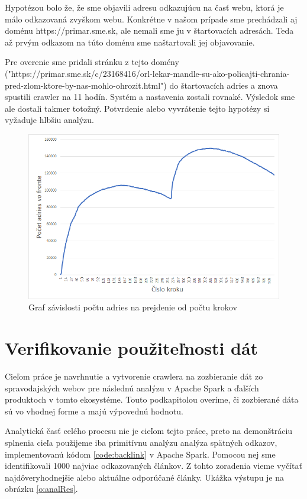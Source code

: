 Hypotézou bolo že, že sme objavili adresu odkazujúcu na časť webu, ktorá je málo odkazovaná zvyškom webu. Konkrétne v našom prípade sme prechádzali aj doménu https://primar.sme.sk, ale nemali sme ju v štartovacích adresách. Teda až prvým odkazom na túto doménu sme naštartovali jej objavovanie. 

Pre overenie sme pridali stránku z tejto domény ("https://primar.sme.sk/c/23168416/orl-lekar-mandle-su-ako-policajti-chrania-pred-zlom-ktore-by-nas-mohlo-ohrozit.html") do štartovacích adries a znova spustili crawler na 11 hodín. Systém a nastavenia zostali rovnaké. Výsledok sme ale dostali takmer totožný. Potvrdenie alebo vyvrátenie tejto hypotézy si vyžaduje hlbšiu analýzu.

\begin{figure}[!ht]
    \centering
    \includegraphics[width=.9\textwidth]{figures/umSizeChart.png}
    \caption{Graf závislosti počtu adries na prejdenie od počtu krokov\label{o:umSizeChart}}
\end{figure}





\section{Verifikovanie použiteľnosti dát}
Cieľom práce je navrhnutie a vytvorenie crawlera na zozbieranie dát zo spravodajských webov pre následnú analýzu v Apache Spark a ďalších produktoch v tomto ekosystéme. Touto podkapitolou overíme, či zozbierané dáta sú vo vhodnej forme a majú výpovednú hodnotu. 

Analytická časť celého procesu nie je cieľom tejto práce, preto na demonštráciu splnenia cieľa použijeme iba primitívnu analýzu analýza spätných odkazov, implementovanú kódom \ref{code:backlink} v Apache Spark. Pomocou nej sme identifikovali 1000 najviac odkazovaných článkov. Z tohto zoradenia vieme vyčítať najdôveryhodnejšie alebo aktuálne odporúčané články. Ukážka výstupu je na obrázku \ref{o:analRes}.

